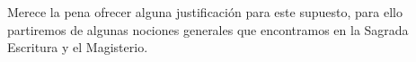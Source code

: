 Merece la pena ofrecer alguna justificación para este supuesto, para ello partiremos de algunas nociones generales que encontramos en la Sagrada Escritura y el Magisterio.




















